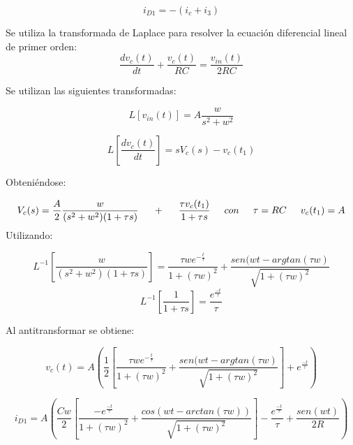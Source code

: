 \begin{equation*}
	i_{D1} = - \left( i_c + i_3 \right)
\end{equation*}

Se utiliza la transformada de Laplace para resolver la ecuación diferencial lineal de primer orden:
\begin{equation}
\frac{dv_c(t)}{dt}+\frac{v_c(t)}{RC}=\frac{v_{in}(t)}{2RC}
\end{equation}

Se utilizan las siguientes transformadas:

\begin{equation*}
	L\left[ v_{in}(t) \right] = A\frac{w}{s^2 + w^2}
\end{equation*}


\begin{equation*}
	L \left[ \frac{dv_c(t)}{dt} \right] = sV_c(s)-v_c(t_1)
\end{equation*}

Obteniéndose:

\begin{equation*}
	V_c(s) = \frac{A}{2}\frac{w}{(s^2+w^2)(1+\tau s)} \hspace{0.5cm} + \hspace{0.5cm} \frac{\tau v_c(t_1)}{1+\tau s} \hspace{0.5cm} con \hspace{0.5cm} \tau = RC \hspace{0.5cm} v_c(t_1) = A
\end{equation*}
 Utilizando: 
 
 \begin{equation*}
 L^{-1}\left[ \frac{w}{(s^2+w^2)(1+\tau s)} \right] = \frac{\tau w e^{-\frac{t}{\tau}}}{1 + (\tau w)^2} + \frac{sen(wt-argtan(\tau w)}{\sqrt{1+(\tau w)^2}}
 \end{equation*}
 \begin{equation*}
 	L^{-1}\left[ \frac{1}{1+\tau s}\right] = \frac{e^{\frac{-t}{\tau}}}{\tau }
 \end{equation*}

Al antitransformar se obtiene:

\begin{equation*}
	v_c(t) = A\left(\frac{1}{2}\left[ \frac{\tau w e^{-\frac{t}{\tau}}}{1 + (\tau w)^2} + \frac{sen(wt-argtan(\tau w)}{\sqrt{1+(\tau w)^2}}  \right] + e^\frac{-t}{\tau } \right)
\end{equation*}


\begin{equation*}
	i_{D1} = A \left( \frac{Cw}{2} \left[ \frac{- e^\frac{-t}{\tau}}{1+(\tau w)^2} + \frac{cos(wt-arctan(\tau w))}{\sqrt{1+(\tau w)^2}}\right] -\frac{e^\frac{-t}{\tau}}{\tau}+\frac{sen(wt)}{2R}\right)
\end{equation*}





